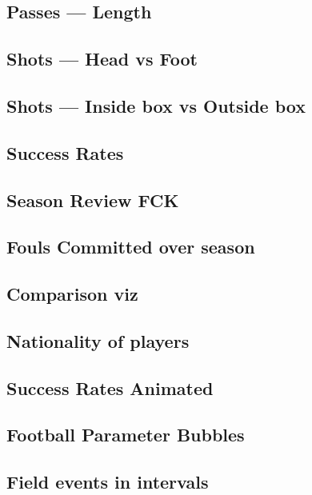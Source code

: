 \documentclass[a4paper,11pt]{article}
\begin{document}
\subsection{Passes --- Length}


\subsection{Shots --- Head vs Foot}


\subsection{Shots --- Inside box vs Outside box}


\subsection{Success Rates}


\subsection{Season Review FCK}


\subsection{Fouls Committed over season}


\subsection{Comparison viz}


\subsection{Nationality of players}


\subsection{Success Rates Animated}


\subsection{Football Parameter Bubbles}


\subsection{Field events in intervals}

\end{document}
